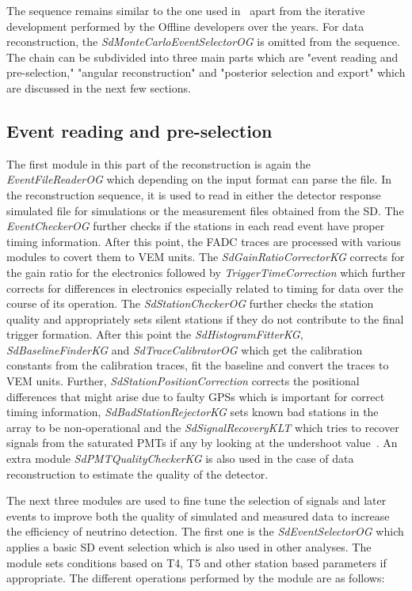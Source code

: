 The sequence remains similar to the one used in~\cite{gap_note_2013} apart from the iterative development performed by the Offline developers over the years. For data reconstruction, the \textit{SdMonteCarloEventSelectorOG} is omitted from the sequence. The chain can be subdivided into three main parts which are "event reading and pre-selection," "angular reconstruction" and "posterior selection and export" which are discussed in the next few sections.

\subsection{Event reading and pre-selection}
\label{subsec:reco_presel}

The first module in this part of the reconstruction is again the \textit{EventFileReaderOG} which depending on the input format can parse the file. In the reconstruction sequence, it is used to read in either the detector response simulated file for simulations or the measurement files obtained from the SD. The \textit{EventCheckerOG} further checks if the stations in each read event have proper timing information. After this point, the FADC traces are processed with various modules to covert them to VEM units. The \textit{SdGainRatioCorrectorKG} corrects for the gain ratio for the electronics followed by \textit{TriggerTimeCorrection} which further corrects for differences in electronics especially related to timing for data over the course of its operation. The \textit{SdStationCheckerOG} further checks the station quality and appropriately sets silent stations if they do not contribute to the final trigger formation. After this point the \textit{SdHistogramFitterKG}, \textit{SdBaselineFinderKG} and \textit{SdTraceCalibratorOG} which get the calibration constants from the calibration traces, fit the baseline and convert the traces to VEM units. Further, \textit{SdStationPositionCorrection} corrects the positional differences that might arise due to faulty GPSs which is important for correct timing information, \textit{SdBadStationRejectorKG} sets known bad stations in the array to be non-operational and the \textit{SdSignalRecoveryKLT} which tries to recover signals from the saturated PMTs if any by looking at the undershoot value~\cite{Veberic:2013suc,PierreAuger:2020yab}. An extra module \textit{SdPMTQualityCheckerKG} is also used in the case of data reconstruction to estimate the quality of the detector.

The next three modules are used to fine tune the selection of signals and later events to improve both the quality of simulated and measured data to increase the efficiency of neutrino detection. The first one is the \textit{SdEventSelectorOG} which applies a basic SD event selection which is also used in other analyses. The module sets conditions based on T4, T5 and other station based parameters if appropriate. The different operations performed by the module are as follows:

